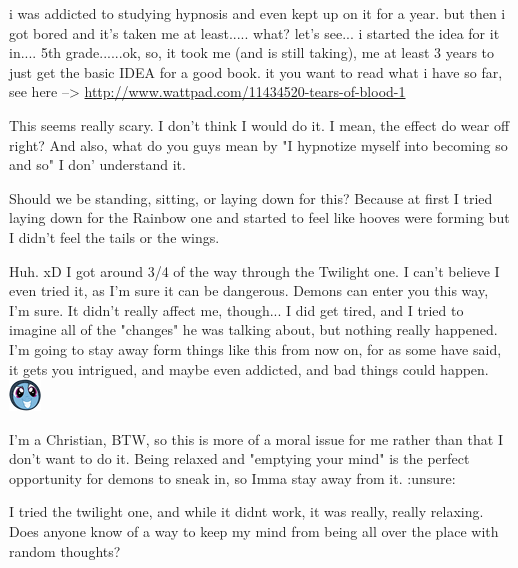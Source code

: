\documentclass[ebook,12pt,oneside,openany]{memoir}
\begin{document}
\begin{tcolorbox}[title=AzuelFox102]
\par{i was addicted to studying hypnosis and even kept up on it for a year. but then i got bored and it's taken me at least..... what? let's see... i started the idea for it in.... 5th grade......ok, so, it took me (and is still taking), me at least 3 years to just get the basic IDEA for a good book. it you want to read what i have so far, see here --> \href{http://www.wattpad.com/11434520-tears-of-blood-1}{http://www.wattpad.com/11434520-tears-of-blood-1}}
\end{tcolorbox}
\begin{tcolorbox}[title=SkyGust]
\par{This seems really scary. I don't think I would do it. I mean, the effect do wear off right? And also, what do you guys mean by  "I hypnotize myself into becoming so and so" I don' understand it. }
\end{tcolorbox}
\begin{tcolorbox}[title=Admiral Colt]
\par{Should we be standing, sitting, or laying down for this? Because at first I tried laying down for the Rainbow one and started to feel like hooves were forming but I didn't feel the tails or the wings.}
\end{tcolorbox}
\begin{tcolorbox}[title=MatrixChicken]
\par{Huh. xD I got around 3/4 of the way through the Twilight one. I can't believe I even tried it, as I'm sure it can be dangerous. Demons can enter you this way, I'm sure. It didn't really affect me, though... I did get tired, and I tried to imagine all of the "changes" he was talking about, but nothing really happened. I'm going to stay away form things like this from now on, for as some have said, it gets you intrigued, and maybe even addicted, and bad things could happen.  \includegraphics{images/mlp_PR6Zd18.png}}
\newline{}
\par{I'm a Christian, BTW, so this is more of a moral issue for me rather than that I don't want to do it. Being relaxed and "emptying your mind" is the perfect opportunity for demons to sneak in, so Imma stay away from it. :unsure:}
\end{tcolorbox}
\begin{tcolorbox}[title=Delete this account,colback=purple!5!white,colframe=purple!75!black,coltitle=white]
\par{I tried the twilight one, and while it didnt work, it was really, really relaxing. Does anyone know of a way to keep my mind from being all over the place with random thoughts?}
\end{tcolorbox}
\end{document}
